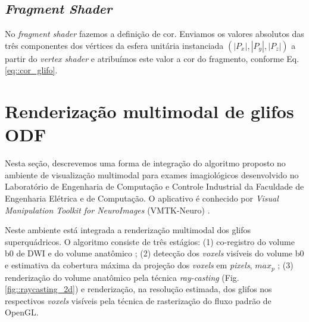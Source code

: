 
\subsection{\textit{Fragment Shader}}

No \textit{fragment shader} fazemos a definição de cor. Enviamos os valores absolutos das três componentes dos vértices da esfera unitária instanciada $(|P_x|, |P_y|, |P_z|)$ a partir do \textit{vertex shader} e atribuímos este valor a cor do fragmento, conforme Eq. \ref{eq::cor_glifo}.


\section{Renderização multimodal de glifos ODF}
\label{sec::superquadricas}

Nesta seção, descrevemos uma forma de integração do algoritmo proposto no 
ambiente de visualização multimodal para exames imagiológicos desenvolvido no Laboratório de Engenharia de Computação e Controle Industrial da Faculdade de Engenharia Elétrica e de Computação. O aplicativo é conhecido por \textit{Visual Manipulation Toolkit for NeuroImages} (VMTK-Neuro) \cite{VMTKNeuro}.

Neste ambiente está integrada a renderização multimodal dos glifos superquádricos. O algoritmo consiste de três estágios: (1) co-registro do volume b0 de DWI e do volume anatômico  \cite{ting2014}; (2) detecção dos \textit{voxels} visíveis do volume b0 e estimativa da cobertura máxima da projeção dos \textit{voxels} em \textit{pixels}, $max_p$ \cite{voltoline2021}; (3) renderização do volume anatômico pela técnica \textit{ray-casting} (Fig. \ref{fig::raycasting_2d}) \cite{kruger2003} e renderização, na resolução estimada, dos glifos nos respectivos \textit{voxels} visíveis pela técnica de rasterização do fluxo padrão de OpenGL.

